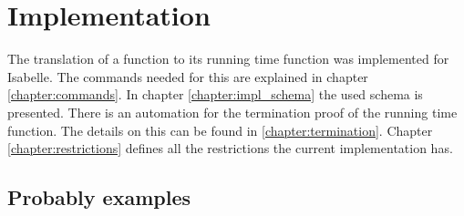
\chapter{Implementation}\label{chapter:impl}

The translation of a function to its running time function was implemented for Isabelle.
The commands needed for this are explained in chapter \ref{chapter:commands}.
In chapter \ref{chapter:impl_schema} the used schema is presented.
There is an automation for the termination proof of the running time function.
The details on this can be found in \ref{chapter:termination}.
Chapter \ref{chapter:restrictions} defines all the restrictions the current implementation has.






\section{Probably examples}
